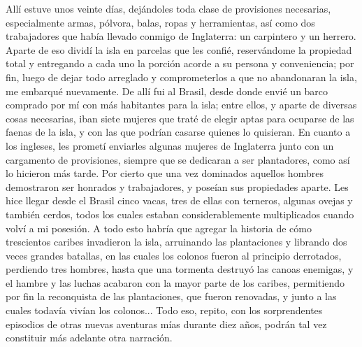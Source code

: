 \documentclass{novela}
\begin{document}
    Allí estuve unos veinte días, dejándoles toda clase de provisiones necesarias, especialmente armas, pólvora, balas, ropas y herramientas, así como dos trabajadores que había llevado conmigo de Inglaterra: un carpintero y un herrero.
    Aparte de eso dividí la isla en parcelas que les confié, reservándome la propiedad total y entregando a cada uno la porción acorde a su persona y conveniencia; por fin, luego de dejar todo arreglado y comprometerlos a que no abandonaran la isla, me embarqué nuevamente.
    De allí fui al Brasil, desde donde envié un barco comprado por mí con más habitantes para la isla; entre ellos, y aparte de diversas cosas necesarias, iban siete mujeres que traté de elegir aptas para ocuparse de las faenas de la isla, y con las que podrían casarse quienes lo quisieran. En cuanto a los ingleses, les prometí enviarles algunas mujeres de Inglaterra junto con un cargamento de provisiones, siempre que se dedicaran a ser plantadores, como así lo hicieron más tarde. Por cierto que una vez dominados aquellos hombres demostraron ser honrados y trabajadores, y poseían sus propiedades aparte. Les hice llegar desde el Brasil cinco vacas, tres de ellas con terneros, algunas ovejas y también cerdos, todos los cuales estaban considerablemente multiplicados cuando volví a mi posesión.
    A todo esto habría que agregar la historia de cómo trescientos caribes invadieron la isla, arruinando las plantaciones y librando dos veces grandes batallas, en las cuales los colonos fueron al principio derrotados, perdiendo tres hombres, hasta que una tormenta destruyó las canoas enemigas, y el hambre y las luchas acabaron con la mayor parte de los caribes, permitiendo por fin la reconquista de las plantaciones, que fueron renovadas, y junto a las cuales todavía vivían los colonos... Todo eso, repito, con los sorprendentes episodios de otras nuevas aventuras mías durante diez años, podrán tal vez constituir más adelante otra narración.
\end{document}
